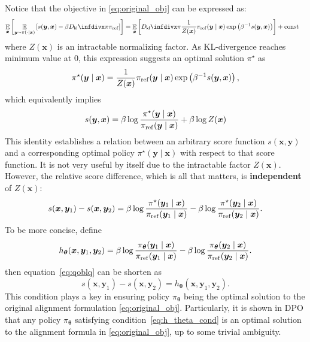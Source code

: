 \documentclass[11pt,a4paper]{article}
\begin{document}
Notice that the objective in \eqref{eq:original_obj} can be expressed as:
\begin{align*}
\mathop{\mathbb{E}}_{\bm{x}} \left[ \mathop{\mathbb{E}}_{\bm{y} \sim \pi(\cdot \mid \bm{x})} \left[  s(\bm{y}, \bm{x}) - \beta \Dkl{\pi}{\pi_{\rm ref}}\right] \right] 
&= \mathop{\mathbb{E}}_{\bm{x}} \left[  \Dkl{\pi}{\dfrac{1}{Z(\bm{x})} \pi_{\rm ref}(\bm{y} \mid \bm{x})\exp\left(\beta^{-1} s(\bm{y}, \bm{x})\right) } \right] + \text{const}
\end{align*}
where $Z(\bm{x})$ is an intractable normalizing factor.
As KL-divergence reaches minimum value at $0$, this expression suggests an optimal solution $\pi^{\star }$ as
\[
\pi^{\star }(\bm{y} \mid \bm{x}) = \dfrac{1}{Z(\bm{x})} \pi_{\rm ref}(\bm{y} \mid \bm{x}) \exp \left( \beta^{-1}  s(\bm{y}, \bm{x}) \right),
\] 
which equivalently implies
\[
s(\bm{y}, \bm{x}) = \beta \log \dfrac{\pi^{\star }(\bm{y} \mid \bm{x})}{\pi_{\rm ref}(\bm{y} \mid \bm{x})} + \beta \log Z(\bm{x})
\] 
This identity establishes a relation between an arbitrary score function $s(\bm{x}, \bm{y})$ and a corresponding optimal policy $\pi^{\star }(\bm{y}\mid \bm{x})$ with respect to that score function. It is not very useful by itself due to the intractable factor $Z(\bm{x})$. However, the relative score difference, which is all that matters, is \textbf{independent} of $Z(\bm{x})$:
\begin{equation}
    \label{eq:qoblq}
s(\bm{x}, \bm{y}_1) - s(\bm{x}, \bm{y}_2) = \beta \log \dfrac{\pi^{\star }(\bm{y}_1\mid \bm{x})}{\pi_{\rm ref}(\bm{y}_1 \mid \bm{x})} - \beta \log \dfrac{\pi^{\star }(\bm{y}_2\mid \bm{x})}{\pi_{\rm ref}(\bm{y}_2 \mid \bm{x})}.
\end{equation} 
To be more concise, define
\[
h_{\boldsymbol \theta}(\bm{x}, \bm{y}_1, \bm{y}_2)=\beta \log \dfrac{\pi_{\boldsymbol \theta }(\bm{y}_1\mid \bm{x})}{\pi_{\rm ref}(\bm{y}_1 \mid \bm{x})} - \beta \log \dfrac{\pi_{\boldsymbol \theta }(\bm{y}_2\mid \bm{x})}{\pi_{\rm ref}(\bm{y}_2 \mid \bm{x})}.
\]
then equation~\eqref{eq:qoblq} can be shorten as
\begin{equation}
\label{eq:h_theta_cond}
s(\bm{x}, \bm{y}_1) - s(\bm{x}, \bm{y}_2) = h_{\boldsymbol \theta}(\bm{x}, \bm{y}_1, \bm{y}_2).
\end{equation} 
This condition plays a key in ensuring policy $\pi_{\boldsymbol \theta }$ being the optimal solution to the original alignment formulation \eqref{eq:original_obj}. Particularly, it is shown in DPO that any policy $\pi_{\boldsymbol \theta}$ satisfying condition~\eqref{eq:h_theta_cond} is an optimal solution to the alignment formula in \eqref{eq:original_obj}, up to some trivial ambiguity.
\end{document}
